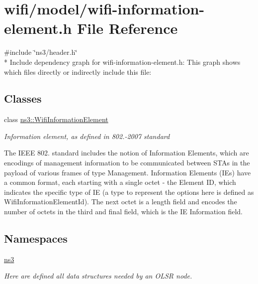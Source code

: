 \hypertarget{wifi-information-element_8h}{}\section{wifi/model/wifi-\/information-\/element.h File Reference}
\label{wifi-information-element_8h}
{\ttfamily \#include \char`\"{}ns3/header.\+h\char`\"{}}\\*
Include dependency graph for wifi-\/information-\/element.h\+:
This graph shows which files directly or indirectly include this file\+:
\subsection*{Classes}
\begin{DoxyCompactItemize}
\item 
class \hyperlink{classns3_1_1WifiInformationElement}{ns3\+::\+Wifi\+Information\+Element}
\begin{DoxyCompactList}\small\item\em Information element, as defined in 802.-\/2007 standard

The I\+E\+EE 802. standard includes the notion of Information Elements, which are encodings of management information to be communicated between S\+T\+As in the payload of various frames of type Management. Information Elements (I\+Es) have a common format, each starting with a single octet -\/ the Element ID, which indicates the specific type of IE (a type to represent the options here is defined as Wifi\+Information\+Element\+Id). The next octet is a length field and encodes the number of octets in the third and final field, which is the IE Information field. \end{DoxyCompactList}\end{DoxyCompactItemize}
\subsection*{Namespaces}
\begin{DoxyCompactItemize}
\item 
 \hyperlink{namespacens3}{ns3}
\begin{DoxyCompactList}\small\item\em Here are defined all data structures needed by an O\+L\+SR node. \end{DoxyCompactList}\end{DoxyCompactItemize}
